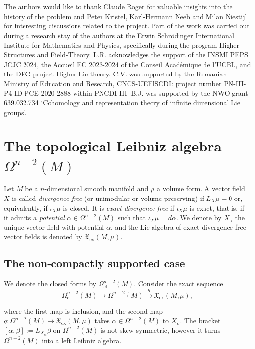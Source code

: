 \documentclass{article}
\newcommand{\ex}{\mathrm{ex}}
\newcommand{\cl}{\mathrm{cl}}
\newcommand{\fX}{\mathfrak{X}}
\theoremstyle{definition}
\begin{document}
The authors would like to thank Claude Roger for valuable insights into the history of the problem and Peter Kristel, Karl-Hermann Neeb and Milan Niestijl for interesting discussions related to the project. 
Part of the work was carried out during a research stay of the authors at the Erwin Schrödinger International Institute
for Mathematics and Physics, specifically during the program Higher Structures and Field-Theory. L.R. acknowledges the support of the INSMI PEPS JCJC 2024, the Accueil EC 2023-2024 of the Conseil Académique de l’UCBL, and the DFG-project Higher Lie theory.
C.V. was supported by the Romanian Ministry of Education and Research,
CNCS-UEFISCDI: project number PN-III-P4-ID-PCE-2020-2888 within
PNCDI III. B.J. was supported by the NWO grant 639.032.734 `Cohomology and representation theory of infinite dimensional Lie groups'.



\section{\texorpdfstring{The topological Leibniz algebra $\Omega^{n-2}(M)$}{The topological Leibniz algebra of forms}}\label{s:prem}




Let $M$ be a $n$-dimensional smooth manifold and $\mu$ a volume form. 
A vector field $X$ is called \emph{divergence-free} (or unimodular or volume-preserving) if $L_{X}\mu = 0$ or, equivalently, if $\iota_{X}\mu$ is closed. It is \emph{exact divergence-free} if $\iota_{X}\mu$ is exact, that is, if it admits a \emph{potential} $\alpha \in \Omega^{n-2}(M)$ 
such that $\iota_{X}\mu = d\alpha$. 
We denote by 
$X_{\alpha}$ the unique vector field with potential $\alpha$, and the Lie algebra of exact divergence-free vector fields 
is denoted by
$
\fX_{\ex}(M,\mu) 
$.

\subsection{The non-compactly supported case}
We denote the closed forms by $\Omega^{n-2}_{\cl}(M)$. Consider the exact sequence 
\begin{equation}\label{ExactSequenceLeibniz}
\Omega^{n-2}_{\cl}(M)\longrightarrow \Omega^{n-2}(M)\stackrel{q}{\longrightarrow} \fX_{\ex}(M,\mu),
\end{equation}

where the first map is inclusion, and the second map $q \colon \Omega^{n-2}(M) \rightarrow \fX_{\ex}(M,\mu)$ 
takes $\alpha\in \Omega^{n-2}(M)$ to $X_{\alpha}$.
The bracket $[\alpha, \beta] := L_{X_{\alpha}}\beta$ on  $\Omega^{n-2}(M)$ is not skew-symmetric, however it turns $\Omega^{n-2}(M)$ into a left Leibniz algebra.
\end{document}
